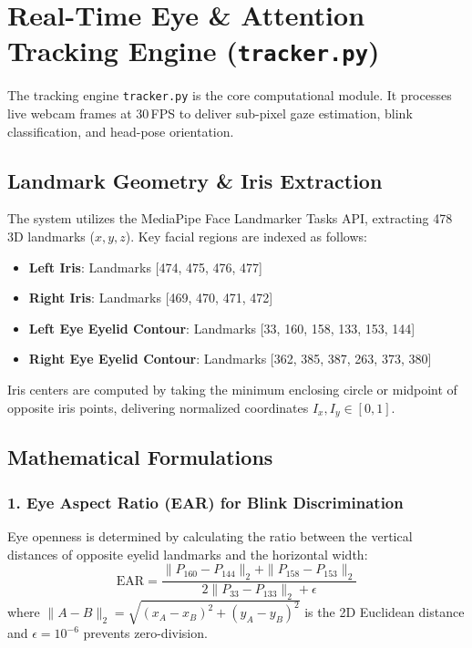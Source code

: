 \documentclass[11pt,a4paper]{article}
\begin{document}
\section{Real-Time Eye \& Attention Tracking Engine (\texttt{tracker.py})}

The tracking engine \texttt{tracker.py} is the core computational module. It processes live webcam frames at 30\,FPS to deliver sub-pixel gaze estimation, blink classification, and head-pose orientation.

\subsection{Landmark Geometry \& Iris Extraction}
The system utilizes the MediaPipe Face Landmarker Tasks API, extracting 478 3D landmarks ($x, y, z$). Key facial regions are indexed as follows:
\begin{itemize}
    \item \textbf{Left Iris}: Landmarks [474, 475, 476, 477]
    \item \textbf{Right Iris}: Landmarks [469, 470, 471, 472]
    \item \textbf{Left Eye Eyelid Contour}: Landmarks [33, 160, 158, 133, 153, 144]
    \item \textbf{Right Eye Eyelid Contour}: Landmarks [362, 385, 387, 263, 373, 380]
\end{itemize}
Iris centers are computed by taking the minimum enclosing circle or midpoint of opposite iris points, delivering normalized coordinates $I_x, I_y \in [0, 1]$.

\subsection{Mathematical Formulations}

\subsubsection{1. Eye Aspect Ratio (EAR) for Blink Discrimination}
Eye openness is determined by calculating the ratio between the vertical distances of opposite eyelid landmarks and the horizontal width:
\begin{equation}
\text{EAR} = \frac{\|P_{160} - P_{144}\|_2 + \|P_{158} - P_{153}\|_2}{2 \|P_{33} - P_{133}\|_2 + \epsilon}
\end{equation}
where $\|A - B\|_2 = \sqrt{(x_A - x_B)^2 + (y_A - y_B)^2}$ is the 2D Euclidean distance and $\epsilon = 10^{-6}$ prevents zero-division. 
\end{document}
